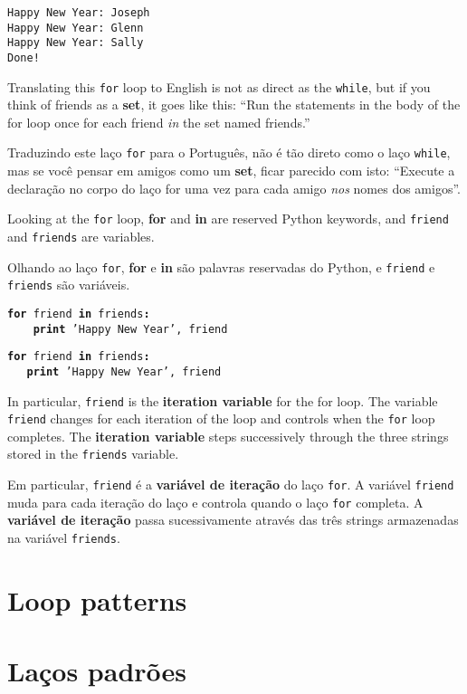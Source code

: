 \beforeverb
\begin{verbatim}
Happy New Year: Joseph
Happy New Year: Glenn
Happy New Year: Sally
Done!
\end{verbatim}
\afterverb
%

Translating this {\tt for} loop to English is not as direct as the 
{\tt while}, but if you think of friends as a {\bf set},
it goes like this: ``Run the statements in the body of the 
for loop once for each friend \emph{in} the set named friends.''

Traduzindo este laço {\tt for} para o Português, não é tão direto como o laço
{\tt while}, mas se você pensar em amigos como um {\bf set}, ficar parecido
com isto: ``Execute a declaração no corpo do laço for uma vez para cada amigo
\emph{nos} nomes dos amigos''.

Looking at the {\tt for} loop, {\bf for} and {\bf in} are reserved
Python keywords, and {\tt friend} and {\tt friends} are variables.

Olhando ao laço {\tt for}, {\bf for} e {\bf in} são palavras reservadas do
Python, e {\tt friend} e {\tt friends} são variáveis.

{\tt {\bf for} friend {\bf in} friends{\bf :}\\
\verb"    "{\bf print} 'Happy New Year', friend }

{\tt {\bf for} friend {\bf in} friends{\bf :}\\
	\verb"   "{\bf print} 'Happy New Year', friend }

In particular, {\tt friend} is the {\bf iteration variable} for 
the for loop.  The variable {\tt friend} changes for each iteration of
the loop and controls when the {\tt for} loop completes.  The 
{\bf iteration variable} steps successively through the 
three strings stored in the {\tt friends} variable.

Em particular, {\tt friend} é a {\bf variável de iteração} do laço {\tt for}.
A variável {\tt friend} muda para cada iteração do laço e controla quando o
laço {\tt for} completa. A {\bf variável de iteração} passa sucessivamente
através das três strings armazenadas na variável {\tt friends}.


\section{Loop patterns}
\section{Laços padrões}

